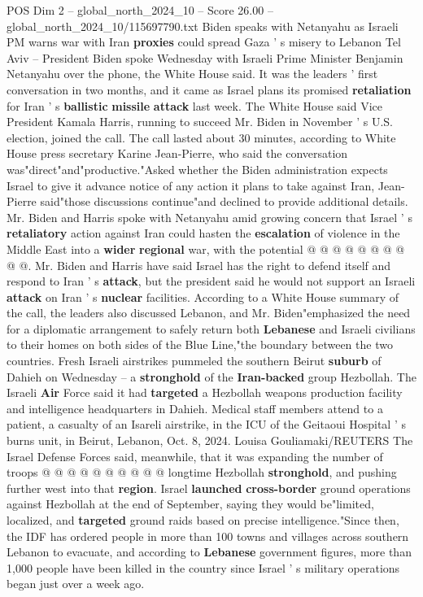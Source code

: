 \begin{textsample}{POS Dim 2 – global\_north\_2024\_10 – Score 26.00 – global\_north\_2024\_10/115697790.txt}  \label{ex:f2_pos_080}
Biden speaks with Netanyahu as Israeli PM warns war with Iran \textbf{proxies} could spread Gaza ' s misery to Lebanon Tel Aviv -- President Biden spoke Wednesday with Israeli Prime Minister Benjamin Netanyahu over the phone, the White House said.
It was the leaders ' first conversation in two months, and it came as Israel plans its promised \textbf{retaliation} for Iran ' s \textbf{ballistic} \textbf{missile} \textbf{attack} last week.
The White House said Vice President Kamala Harris, running to succeed Mr.
Biden in November ' s U.S. election, joined the call.
The call lasted about 30 minutes, according to White House press secretary Karine Jean-Pierre, who said the conversation was"direct"and"productive."Asked whether the Biden administration expects Israel to give it advance notice of any action it plans to take against Iran, Jean-Pierre said"those discussions continue"and declined to provide additional details.
Mr.
Biden and Harris spoke with Netanyahu amid growing concern that Israel ' s \textbf{retaliatory} action against Iran could hasten the \textbf{escalation} of violence in the Middle East into a \textbf{wider} \textbf{regional} war, with the potential @ @ @ @ @ @ @ @ @ @.
Mr.
Biden and Harris have said Israel has the right to defend itself and respond to Iran ' s \textbf{attack}, but the president said he would not support an Israeli \textbf{attack} on Iran ' s \textbf{nuclear} facilities.
According to a White House summary of the call, the leaders also discussed Lebanon, and Mr.
Biden"emphasized the need for a diplomatic arrangement to safely return both \textbf{Lebanese} and Israeli civilians to their homes on both sides of the Blue Line,"the boundary between the two countries.
Fresh Israeli airstrikes pummeled the southern Beirut \textbf{suburb} of Dahieh on Wednesday -- a \textbf{stronghold} of the \textbf{Iran-backed} group Hezbollah.
The Israeli \textbf{Air} Force said it had \textbf{targeted} a Hezbollah weapons production facility and intelligence headquarters in Dahieh.
Medical staff members attend to a patient, a casualty of an Isareli airstrike, in the ICU of the Geitaoui Hospital ' s burns unit, in Beirut, Lebanon, Oct. 8, 2024.
Louisa Gouliamaki/REUTERS The Israel Defense Forces said, meanwhile, that it was expanding the number of troops @ @ @ @ @ @ @ @ @ @ longtime Hezbollah \textbf{stronghold}, and pushing further west into that \textbf{region}.
Israel \textbf{launched} \textbf{cross-border} ground operations against Hezbollah at the end of September, saying they would be"limited, localized, and \textbf{targeted} ground raids based on precise intelligence."Since then, the IDF has ordered people in more than 100 towns and villages across southern Lebanon to evacuate, and according to \textbf{Lebanese} government figures, more than 1,000 people have been killed in the country since Israel ' s military operations began just over a week ago.

\end{textsample}
